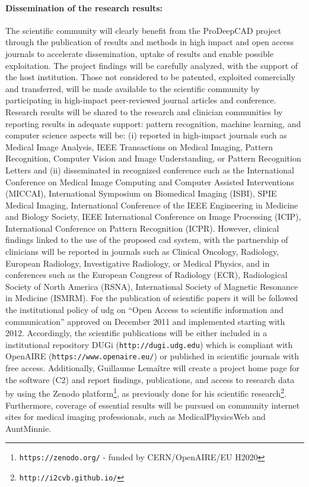 \paragraph{Dissemination of the research results:}
The scientific community will clearly benefit from the ProDeepCAD project through the publication of results and methods in high impact and open access journals to accelerate dissemination, uptake of results and enable possible exploitation.
The project findings will be carefully analyzed, with the support of the host institution. Those not considered to be patented, exploited comercially and transferred, will be made available to the scientific community by participating in high-impact peer-reviewed journal articles and conference.
Research results will be shared to the research and clinician communities by reporting results in adequate support: pattern recognition, machine learning, and computer science aspects will be: (i) reported in high-impact journals such as Medical Image Analysis, IEEE Transactions on Medical Imaging, Pattern Recognition, Computer Vision and Image Understanding, or Pattern Recognition Letters and (ii) disseminated in recognized conference such as the International Conference on Medical Image Computing and Computer Assisted Interventions (MICCAI), International Symposium on Biomedical Imaging (ISBI), SPIE Medical Imaging, International Conference of the IEEE Engineering in Medicine and Biology Society, IEEE International Conference on Image Processing (ICIP), International Conference on Pattern Recognition (ICPR).
However, clinical findings linked to the use of the proposed \ac{cad} system, with the partnership of clinicians will be reported in journals such as Clinical Oncology, Radiology, European Radiology, Investigative Radiology, or Medical Physics, and in conferences such as the European Congress of Radiology (ECR), Radiological Society of North America (RSNA), International Society of Magnetic Resonance in Medicine (ISMRM).
For the publication of scientific papers it will be followed the institutional policy of \ac{udg} on ``Open Access to scientific information and communication'' approved on December 2011 and implemented starting with 2012.
Accordingly, the scientific publications will be either included in a institutional repository DUGi (\texttt{http://dugi.udg.edu}) which is compliant with OpenAIRE (\texttt{https://www.openaire.eu/}) or published in scientific journals with free access.
Additionally, Guillaume Lema\^itre  will create a project home page for the software (C2) and report findings, publications, and access to research data by using the Zenodo platform\footnote{\texttt{https://zenodo.org/} - funded by CERN/OpenAIRE/EU H2020}, as previously done for his scientific research\footnote{\texttt{http://i2cvb.github.io/}}.
Furthermore, coverage of essential results will be pursued on community internet sites for medical imaging professionals, such as MedicalPhysicsWeb and AuntMinnie.

